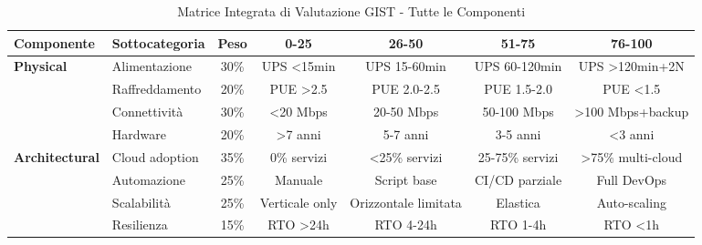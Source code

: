 \begin{landscape}
\begin{table}[H]
\centering
\caption{Matrice Integrata di Valutazione GIST - Tutte le Componenti}
\label{tab:matrice-completa}
\footnotesize
\begin{tabular}{l l c c c c c}
\toprule
\textbf{Componente} & \textbf{Sottocategoria} & \textbf{Peso} & \textbf{0-25} & \textbf{26-50} & \textbf{51-75} & \textbf{76-100} \\
\midrule
\multirow{4}{*}{\textbf{Physical}} 
& Alimentazione & 30\% & UPS <15min & UPS 15-60min & UPS 60-120min & UPS >120min+2N \\
& Raffreddamento & 20\% & PUE >2.5 & PUE 2.0-2.5 & PUE 1.5-2.0 & PUE <1.5 \\
& Connettività & 30\% & <20 Mbps & 20-50 Mbps & 50-100 Mbps & >100 Mbps+backup \\
& Hardware & 20\% & >7 anni & 5-7 anni & 3-5 anni & <3 anni \\
\midrule
\multirow{4}{*}{\textbf{Architectural}} 
& Cloud adoption & 35\% & 0\% servizi & <25\% servizi & 25-75\% servizi & >75\% multi-cloud \\
& Automazione & 25\% & Manuale & Script base & CI/CD parziale & Full DevOps \\
& Scalabilità & 25\% & Verticale only & Orizzontale limitata & Elastica & Auto-scaling \\
& Resilienza & 15\% & RTO >24h & RTO 4-24h & RTO 1-4h & RTO <1h \\
\bottomrule
\end{tabular}
\end{table}
\end{landscape}